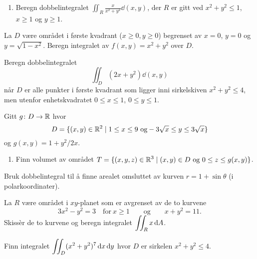 

\oppgave[V2017, Oppgave 4]

\begin{enumerate}
  \item Beregn dobbelintegralet $\displaystyle \iint_R \frac{x}{x^2 + y^2} \dd (x,y)$, der $R$
    er gitt ved $x^2 + y^2 \leq 1$, $x \geq 1$ og $y \geq 1$.
\end{enumerate}

\oppgave[V2016, Oppgave 4] La $D$ være området i første kvadrant ($x \geq 0, y
\geq 0$) begrenset av $x = 0$, $y = 0$ og $y = \sqrt{1 - x^2}$. Beregn
integralet av $f(x,y) = x^2 + y^2$ over $D$.


\oppgave[V2016, Oppgave 4] Beregn dobbelintegralet
%
\begin{equation*}
  \iint_D (2x + y^2) \dd (x,y)
\end{equation*}
%
når $D$ er alle punkter i første kvadrant som ligger inni sirkelskiven $x^2 +
y^2 \leq 4$, men utenfor enhetskvadratet $0 \leq x \leq 1$, $0 \leq y \leq 1$.

\oppgave[V2015, Oppgave 5] Gitt $g \colon D \to \mathbb{R}$ hvor
%
\begin{equation*}
  D = \{ (x,y) \in \R^2 \mid 1 \leq x \leq 9 \ \text{og} -3\sqrt{x} \leq y \leq 3 \sqrt{x} \}
\end{equation*}
%
og $g(x, y) = 1 + y^2/2x$.

\begin{enumerate}
  \item Finn volumet av området
      $ \displaystyle T = \{ (x,y,z) \in \mathbb{R}^3 \mid (x,y) \in D \ \text{og} \ 0 \leq z \leq g(x,y)\}$.
\end{enumerate}


\oppgave[K2014, Oppgave 4] Bruk dobbelintegral til å finne arealet omsluttet av
kurven $r = 1 + \sin \theta$ (i polarkoordinater).


\oppgave[K2012, Oppgave 3] La $R$ være området i $xy$-planet som er avgrenset av
de to kurvene
%
\begin{equation*}
  3x^2 - y^2 = 3 \quad \text{for} \ x \geq 1
  \qquad \text{og} \qquad
  x + y^2 = 11.
\end{equation*}
%
Skissèr de to kurvene og beregn integralet $\displaystyle \iint_R x \mathop{}\! \mathrm{d} A\mathop{}\!$.

\oppgave[V2012, Oppgave 8] Finn integralet $\displaystyle \iint_D (x^2 + y^2)^7
\mathop{}\! \mathrm{d} x\mathop{}\! \mathop{}\! \mathrm{d} y\mathop{}\!$ hvor $D$ er sirkelen $x^2 + y^2 \leq 4$. 

